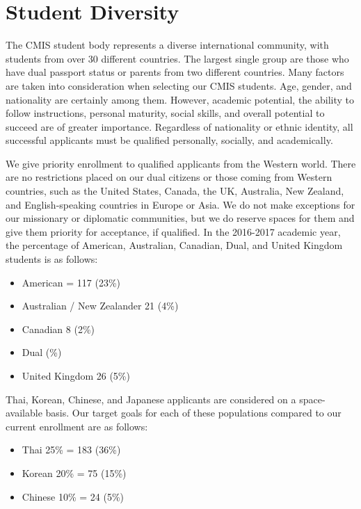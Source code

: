 \documentclass{report}
\begin{document}

\section{Student Diversity}

The CMIS student body represents a diverse international community, with students from over 30 different countries.  The largest single group are those who have dual passport status or parents from two different countries.  Many factors are taken into consideration when selecting our CMIS students.  Age, gender, and nationality are certainly among them.  However, academic potential, the ability to follow instructions, personal maturity, social skills, and overall potential to succeed are of greater importance.  Regardless of nationality or ethnic identity, all successful applicants must be qualified personally, socially, and academically.  

We give priority enrollment to qualified applicants from the Western world.  There are no restrictions placed on our dual citizens or those coming from Western countries, such as the United States, Canada, the UK, Australia, New Zealand, and English-speaking countries in Europe or Asia.  We do not make exceptions for our missionary or diplomatic communities, but we do reserve spaces for them and give them priority for acceptance, if qualified.  In the 2016-2017 academic year, the percentage of American, Australian, Canadian, Dual, and United Kingdom students is as follows:

\begin{itemize}
\item American = 117 (23\%)
\item Australian / New Zealander 21 (4\%)
\item Canadian 8 (2\%)
\item Dual (\%)
\item United Kingdom 26 (5\%)
\end{itemize}

Thai, Korean, Chinese, and Japanese applicants are considered on a space-available basis.  Our target goals for each of these populations compared to our current enrollment are as follows:
\begin{itemize}
\item Thai 25\% = 183 (36\%)
\item Korean 20\% = 75 (15\%)
\item Chinese 10\% = 24 (5\%)
\end{itemize}
\end{document}
